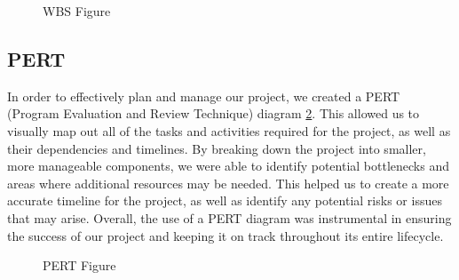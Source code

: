 \documentclass[12pt, a4paper, twocolumn]{article}
\begin{document}
		\begin{figure}[!ht]
				\centering
				\caption[WBS Figure]{WBS Figure} 
				\label{fig:wbs}
		\end{figure}
		\subsection{PERT}
		In order to effectively plan and manage our project, we created a PERT (Program Evaluation and Review Technique) diagram \ref{fig:pert}. This allowed us to visually map out all of the tasks and activities required for the project, as well as their dependencies and timelines. By breaking down the project into smaller, more manageable components, we were able to identify potential bottlenecks and areas where additional resources may be needed. This helped us to create a more accurate timeline for the project, as well as identify any potential risks or issues that may arise. Overall, the use of a PERT diagram was instrumental in ensuring the success of our project and keeping it on track throughout its entire lifecycle.

		\begin{figure}[!ht]
				\centering
				\caption[PERT Figure]{PERT Figure} 
				\label{fig:pert}
		\end{figure}
\end{document}
